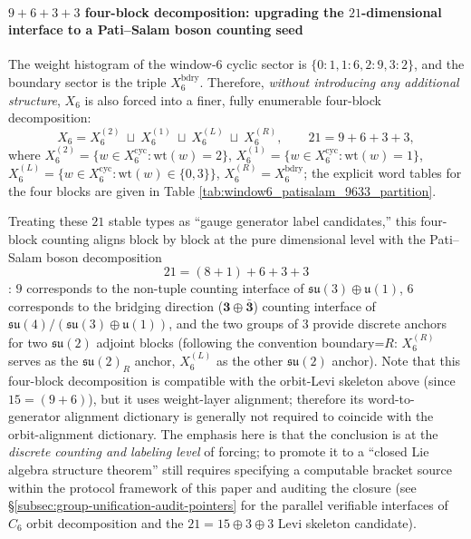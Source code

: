 \paragraph{\texorpdfstring{$9+6+3+3$}{9+6+3+3} four-block decomposition: upgrading the \texorpdfstring{$21$}{21}-dimensional interface to a Pati--Salam boson counting seed}
The weight histogram of the window-6 cyclic sector is \(\{0:1,1:6,2:9,3:2\}\), and the boundary sector is the triple \(X_6^{\mathrm{bdry}}\).
Therefore, \emph{without introducing any additional structure}, \(X_6\) is also forced into a finer, fully enumerable four-block decomposition:
\[
X_6
=X^{(2)}_6\ \sqcup\ X^{(1)}_6\ \sqcup\ X^{(L)}_6\ \sqcup\ X^{(R)}_6,
\qquad
21=9+6+3+3,
\]
where
\(
X^{(2)}_6=\{w\in X_6^{\mathrm{cyc}}:\mathrm{wt}(w)=2\}
\),
\(
X^{(1)}_6=\{w\in X_6^{\mathrm{cyc}}:\mathrm{wt}(w)=1\}
\),
\(
X^{(L)}_6=\{w\in X_6^{\mathrm{cyc}}:\mathrm{wt}(w)\in\{0,3\}\}
\),
\(
X^{(R)}_6=X_6^{\mathrm{bdry}}
\);
the explicit word tables for the four blocks are given in Table \ref{tab:window6_patisalam_9633_partition}.

\par
Treating these \(21\) stable types as ``gauge generator label candidates,'' this four-block counting aligns block by block at the pure dimensional level with the Pati--Salam boson decomposition
\[
21=(8+1)+6+3+3
\]
: \(9\) corresponds to the non-tuple counting interface of \(\mathfrak{su}(3)\oplus\mathfrak{u}(1)\), \(6\) corresponds to the bridging direction (\(\mathbf{3}\oplus\bar{\mathbf{3}}\)) counting interface of
\(\mathfrak{su}(4)/(\mathfrak{su}(3)\oplus\mathfrak{u}(1))\), and the two groups of \(3\) provide discrete anchors for two \(\mathfrak{su}(2)\) adjoint blocks (following the convention boundary=\(R\): \(X^{(R)}_6\) serves as the \(\mathfrak{su}(2)_R\) anchor, \(X^{(L)}_6\) as the other \(\mathfrak{su}(2)\) anchor).
Note that this four-block decomposition is compatible with the orbit-Levi skeleton above (since \(15=(9+6)\)), but it uses weight-layer alignment; therefore its word-to-generator alignment dictionary is generally not required to coincide with the orbit-alignment dictionary.
The emphasis here is that the conclusion is at the \emph{discrete counting and labeling level} of forcing; to promote it to a ``closed Lie algebra structure theorem'' still requires specifying a computable bracket source within the protocol framework of this paper and auditing the closure (see \S\ref{subsec:group-unification-audit-pointers} for the parallel verifiable interfaces of \(C_6\) orbit decomposition and the \(21=15\oplus 3\oplus 3\) Levi skeleton candidate).

